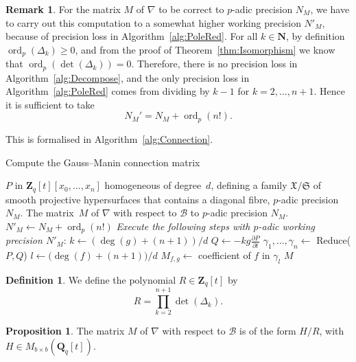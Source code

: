 \documentclass[a4paper,11pt]{article}
\numberwithin{equation}{section}
\newcommand{\NN}{\mathbf{N}} %
\newcommand{\ZZ}{\mathbf{Z}} %
\newcommand{\QQ}{\mathbf{Q}} %
\DeclareMathOperator{\ord}{ord}          %
\providecommand{\cB}{\mathcal{B}} %
\theoremstyle{definition}
\newtheorem{prop}[thm]{Proposition}
\newtheorem{defn}[thm]{Definition}
\newtheorem{rem}[thm]{Remark}
\begin{document}
\begin{rem} \label{rem:precgm}
For the matrix $M$ of $\nabla$ to be correct to $p$-adic precision $N_M$, we have to 
carry out this computation to a somewhat higher working precision $N'_M$, because of 
precision loss in Algorithm~\ref{alg:PoleRed}. 
For all $k \in \NN$, by definition $\ord_p(\Delta_k) \geq 0$, and from the proof
of Theorem~\ref{thm:Isomorphism} we know that $\ord_p(\det(\Delta_k))=0$. 
Therefore, there is no precision loss 
in Algorithm~\ref{alg:Decompose}, and the only precision loss in Algorithm~\ref{alg:PoleRed} 
comes from dividing by $k-1$ for $k=2,\dotsc,n+1$. Hence it is sufficient to take 
\begin{equation*}
N_M'=N_M + \ord_p(n!).
\end{equation*}
\end{rem}
This is formalised in Algorithm~\ref{alg:Connection}.

\begin{algorithm}
\caption{Compute the Gauss--Manin connection matrix}
\label{alg:Connection}
\begin{algorithmic}
\Require $P$ in $\ZZ_q[t][x_0, \dotsc, x_n]$ homogeneous of degree~$d$, 
         defining a family $\mathfrak{X}/\mathfrak{S}$ of smooth projective 
         hypersurfaces that contains a diagonal fibre, $p$-adic precision $N_M$.
\Ensure  The matrix~$M$ of $\nabla$ with respect to $\cB$ to $p$-adic precision $N_M$.
\State $N'_M \gets N_M + \ord_p(n!)$
\State \textit{Execute the following steps with $p$-adic working precision $N'_M$}:
\State $k \gets  (\deg(g)+(n+1))/d$
\State $Q \gets  - k g \frac{\partial P}{\partial t}$ 
\State $\gamma_{1}, \dotsc, \gamma_n \gets$ {\sc Reduce($P,Q$)} 
\State $l \gets \bigl(\deg(f)+(n+1)\bigr)/d$
\State $M_{f,g} \gets$ coefficient of $f$ in $\gamma_l$
\EndFor
\EndFor
\Return $M$
\EndProcedure
\end{algorithmic}
\end{algorithm}

\begin{defn} \label{defn:resultant}
We define the polynomial $R \in \ZZ_q[t]$ by
\[
R = \prod_{k=2}^{n+1}  \det(\Delta_k).
\]
\end{defn}

\begin{prop} \label{thm:denom}
The matrix $M$ of $\nabla$ with respect to $\cB$ is of the form
$H/R$, with $H \in M_{b \times b}(\QQ_q[t])$.
\end{prop}
\end{document}
